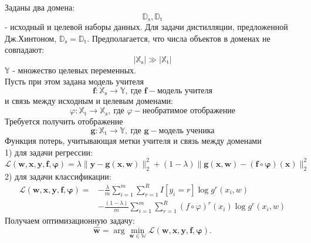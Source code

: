 Заданы два домена: $$\mathbb{D}_{\text{s}}, \mathbb{D}_{\text{t}}$$ - исходный и целевой наборы данных. Для задачи дистилляции, предложенной Дж.Хинтоном, $\mathbb{D}_{\text{s}}=\mathbb{D}_{\text{t}}$. Предполагается, что числа объектов в доменах не совпадают: $$|\mathbb{X}_{\text{s}}| \gg |\mathbb{X}_{\text{t}}|$$
$\mathbb{Y}$ - множество целевых переменных.\\
Пусть при этом задана модель учителя
$$\textbf{f}: \mathbb{X}_{\text{s}} \rightarrow \mathbb{Y}, \ \text{где } \mathbf{f}-\text{модель учителя}$$
и связь между исходным и целевым доменами:
$$\varphi: \mathbb{X}_{\text{t}} \rightarrow \mathbb{X}_{\text{s}}, \ \text{где } \varphi-\text{необратимое отображение}$$ 
Требуется получить отображение $$\textbf{g}: \mathbb{X}_{\text{t}} \rightarrow \mathbb{Y}, \ \text{где } \mathbf{g}-\text{модель ученика}$$
Функция потерь, учитывающая метки учителя и связь между доменами\\
1) для задачи регрессии:
$$\mathcal{L}(\mathbf{w,x,y,f,\varphi})=\lambda\|\mathbf{y}-\mathbf{g}(\mathbf{x},\mathbf{w})\|_{2}^{2}+(1-\lambda)\|\mathbf{g}(\mathbf{x},\mathbf{w})-(\mathbf{f}\circ \mathbf{\varphi})(\mathbf{x})\|_{2}^{2}$$
2) для задачи классификации:
\[
\begin{aligned}
\mathcal{L}(\mathbf{w,x,y,f,\varphi})=&-\frac{\lambda}{m}\sum\limits_{i=1}^{m}\sum\limits_{r=1}^{R}I[y_{i}=r]\log{g^{r}(x_{i},w)}\\
&-\frac{(1-\lambda)}{m}\sum\limits_{i=1}^{m}\sum\limits_{r=1}^{R}(f\circ \varphi)^{r}(x_{i})\log{g^{r}(x_{i},w)}
\end{aligned}
\]
Получаем оптимизационную задачу:
$$\hat{\mathbf{w}} = \arg\min_{\mathbf{w} \in \mathbb{W}} \mathcal{L}(\mathbf{w,x,y,f,\varphi}).$$
